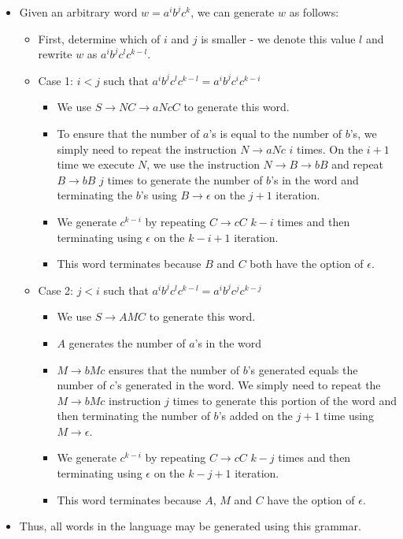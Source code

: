 \documentclass{article}
\begin{document}
\begin{itemize}
    \item Given an arbitrary word \(w = a^i b^j c^k\), we can generate \(w\) as follows:
    \begin{itemize}
        \item First, determine which of \(i\) and \(j\) is smaller - we denote this value \(l\) and rewrite \(w\) as \(a^i b^j c^l c^{k-l}\).
        \item Case 1: \(i<j\) such that \(a^i b^j c^l c^{k-l} = a^i b^j c^i c^{k-i}\)
        \begin{itemize}
            \item We use \(S \to NC \to aNcC\) to generate this word.
            \item To ensure that the number of \(a\)'s is equal to the number of \(b\)'s, we simply need to repeat the instruction \(N \to aNc\) \(i\) times. On the \(i+1\) time we execute \(N\), we use the instruction \(N \to B \to bB\) and repeat \(B \to bB\) \(j\) times to generate the number of \(b\)'s in the word and terminating the \(b\)'s using \(B \to \epsilon\) on the \(j+1\) iteration.
            \item We generate \(c^{k-i}\) by repeating \(C \to cC\) \(k-i\) times and then terminating using \(\epsilon\) on the \(k-i+1\) iteration.
            \item This word terminates because \(B\) and \(C\) both have the option of \(\epsilon\).
        \end{itemize}
        \item Case 2: \(j<i\) such that \(a^i b^j c^l c^{k-l} = a^i b^j c^j c^{k-j}\)
        \begin{itemize}
            \item We use \(S\to AMC\) to generate this word.
            \item \(A\) generates the number of \(a\)'s in the word
            \item \(M \to bMc\) ensures that the number of \(b\)'s generated equals the number of \(c\)'s generated in the word. We simply need to repeat the \(M \to bMc\) instruction \(j\) times to generate this portion of the word and then terminating the number of \(b\)'s added on the \(j+1\) time using \(M \to \epsilon\).
            \item We generate \(c^{k-i}\) by repeating \(C \to cC\) \(k-j\) times and then terminating using \(\epsilon\) on the \(k-j+1\) iteration.
            \item This word terminates because \(A\), \(M\) and \(C\) have the option of \(\epsilon\).
        \end{itemize}
    \end{itemize}
    \item Thus, all words in the language may be generated using this grammar.
\end{itemize}
\\\\
\end{document}
